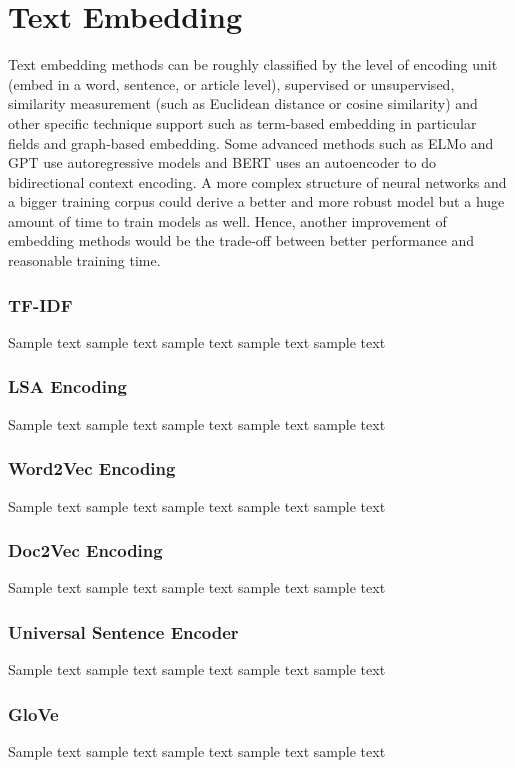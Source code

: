 \section{Text Embedding}
Text embedding methods can be roughly classified by the level of encoding unit (embed in a word, sentence, or article level), supervised or unsupervised, similarity measurement (such as Euclidean distance or cosine similarity) and other specific technique support such as term-based embedding in particular fields and graph-based embedding.
Some advanced methods such as ELMo\cite{peters2018} and GPT\cite{brown2020} use autoregressive models and BERT\cite{niven2019} uses an autoencoder to do bidirectional context encoding.
A more complex structure of neural networks and a bigger training corpus could derive a better and more robust model but a huge amount of time to train models as well.
Hence, another improvement of embedding methods would be the trade-off between better performance and reasonable training time.

\subsubsection{TF-IDF}
Sample text sample text sample text sample text sample text

\subsubsection{LSA Encoding}
Sample text sample text sample text sample text sample text

\subsubsection{Word2Vec Encoding}
Sample text sample text sample text sample text sample text

\subsubsection{Doc2Vec Encoding}
Sample text sample text sample text sample text sample text

\subsubsection{Universal Sentence Encoder}
Sample text sample text sample text sample text sample text

\subsubsection{GloVe}
Sample text sample text sample text sample text sample text


